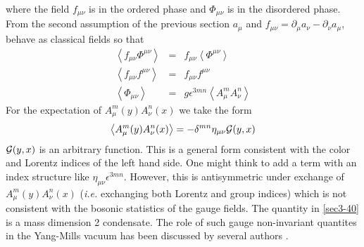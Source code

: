 \documentclass[a4paper,aps,showpacs]{revtex4}
\begin{document}
where the field $f_{\mu \nu}$ is in the ordered phase and $\Phi_{\mu \nu}$ 
is in the disordered phase. From the second assumption of the previous
section  $a_\mu$ and 
$f_{\mu \nu} = \partial_\mu a_\nu - \partial_\nu a_\mu$, behave
as classical fields so that
\begin{eqnarray}
  \left\langle f_{\mu \nu} \Phi^{\mu \nu} \right\rangle & = & 
  f_{\mu \nu} \left\langle \Phi^{\mu \nu} \right\rangle 
\label{sec3-30a}\\
  \left\langle f_{\mu \nu} f^{\mu \nu} \right\rangle & = & 
  f_{\mu \nu}  f^{\mu \nu}   
\label{sec3-30b}\\
  \left\langle \Phi_{\mu \nu} \right\rangle & = & 
  g \epsilon^{3mn} \left\langle A^m_\mu A^n_\nu \right\rangle  
\label{sec3-30c}  
\end{eqnarray} 
For the expectation of  $A^m_\mu(y) A^n_\nu(x) $ we take the form
\begin{equation}
  \left\langle A^m_\mu(y) A^n_\nu(x) \right\rangle = 
  - \delta^{mn} \eta_{\mu \nu} {\cal G}(y,x)
\label{sec3-40}
\end{equation}
${\cal G}(y,x)$ is an arbitrary function. This is a general 
form consistent with the color and Lorentz indices of the left 
hand side. One might think to add a term with an index structure like
 $\eta_{\mu \nu} \epsilon^{3 mn}$. However, this is antisymmetric under exchange
of $A^m_\mu(y) A^n_\nu(x)$ ({\it i.e.} exchanging both Lorentz and group indices)
which is not consistent with the bosonic statistics of the gauge fields. 
The quantity in \eqref{sec3-40} is a mass dimension 2 condensate. The role of
such gauge non-invariant quantites in the Yang-Mills vacuum has been discussed by
several authors \cite{kondo1} \cite{gubarev}. 
\end{document}
